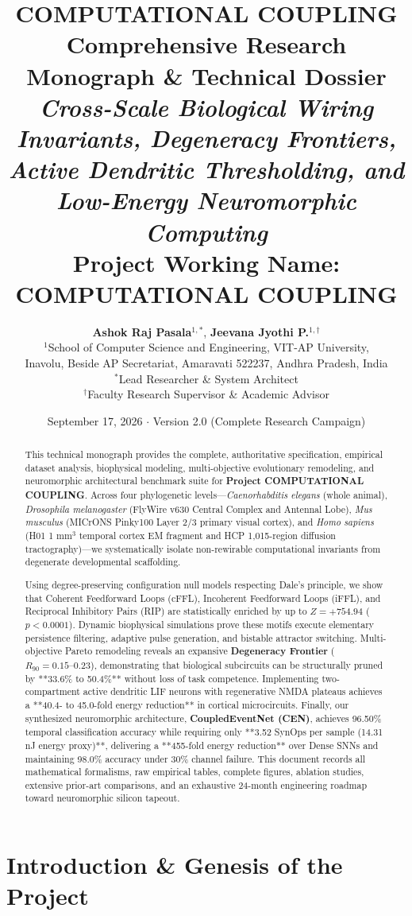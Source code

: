 \documentclass[11pt,letterpaper]{report}
\title{
    \vspace{-20pt}
    {\LARGE \textbf{\color{deepblue}COMPUTATIONAL COUPLING}}\\[8pt]
    {\Large \textbf{\color{brandblue}Comprehensive Research Monograph \& Technical Dossier}}\\[6pt]
    {\large \textit{Cross-Scale Biological Wiring Invariants, Degeneracy Frontiers, Active Dendritic Thresholding, and Low-Energy Neuromorphic Computing}}\\[14pt]
    \textbf{Project Working Name: COMPUTATIONAL COUPLING}
}
\author{
    \textbf{Ashok Raj Pasala}$^{1,*}$, \quad \textbf{Jeevana Jyothi P.}$^{1,\dagger}$ \\[6pt]
    \small $^{1}$School of Computer Science and Engineering, VIT-AP University,\\
    \small Inavolu, Beside AP Secretariat, Amaravati 522237, Andhra Pradesh, India \\[4pt]
    \small $^{*}$Lead Researcher \& System Architect \\[2pt]
    \small $^{\dagger}$Faculty Research Supervisor \& Academic Advisor
}
\date{September 17, 2026 $\cdot$ Version 2.0 (Complete Research Campaign)}
\begin{document}
\maketitle

\begin{abstract}
This technical monograph provides the complete, authoritative specification, empirical dataset analysis, biophysical modeling, multi-objective evolutionary remodeling, and neuromorphic architectural benchmark suite for \textbf{Project COMPUTATIONAL COUPLING}. Across four phylogenetic levels---\textit{Caenorhabditis elegans} (whole animal), \textit{Drosophila melanogaster} (FlyWire v630 Central Complex and Antennal Lobe), \textit{Mus musculus} (MICrONS Pinky100 Layer 2/3 primary visual cortex), and \textit{Homo sapiens} (H01 1 mm$^3$ temporal cortex EM fragment and HCP 1,015-region diffusion tractography)---we systematically isolate non-rewirable computational invariants from degenerate developmental scaffolding.

Using degree-preserving configuration null models respecting Dale's principle, we show that Coherent Feedforward Loops (cFFL), Incoherent Feedforward Loops (iFFL), and Reciprocal Inhibitory Pairs (RIP) are statistically enriched by up to $Z = +754.94$ ($p < 0.0001$). Dynamic biophysical simulations prove these motifs execute elementary persistence filtering, adaptive pulse generation, and bistable attractor switching. Multi-objective Pareto remodeling reveals an expansive \textbf{Degeneracy Frontier} ($R_{90} = 0.15\text{--}0.23$), demonstrating that biological subcircuits can be structurally pruned by **33.6\% to 50.4\%** without loss of task competence. Implementing two-compartment active dendritic LIF neurons with regenerative NMDA plateaus achieves a **40.4- to 45.0-fold energy reduction** in cortical microcircuits. Finally, our synthesized neuromorphic architecture, \textbf{CoupledEventNet (CEN)}, achieves 96.50\% temporal classification accuracy while requiring only **3.52 SynOps per sample (14.31 nJ energy proxy)**, delivering a **455-fold energy reduction** over Dense SNNs and maintaining 98.0\% accuracy under 30\% channel failure. This document records all mathematical formalisms, raw empirical tables, complete figures, ablation studies, extensive prior-art comparisons, and an exhaustive 24-month engineering roadmap toward neuromorphic silicon tapeout.
\end{abstract}

\tableofcontents
\newpage

\chapter{Introduction \& Genesis of the Project}
\end{document}
